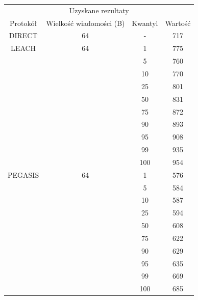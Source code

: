 \documentclass[a4paper,12pt,twoside,openany]{report}
\begin{document}
\begin{longtable}{*{4}{c}}
\toprule
\multicolumn{4}{c}{Uzyskane rezultaty} \\
Protokół	& Wielkość wiadomości (B)	& Kwantyl	& Wartość \\
\midrule
\endhead
DIRECT	& 64 	& -	& 717 \\*
\midrule
LEACH	& 64	& 1	& 775 \\*
	&	& 5	& 760 \\*
	&	& 10	& 770 \\*
	&	& 25	& 801 \\*
	&	& 50	& 831 \\*
	&	& 75	& 872 \\*
	&	& 90	& 893 \\*
	&	& 95	& 908 \\*
	&	& 99	& 935 \\*
	&	& 100	& 954 \\*
\midrule
PEGASIS	& 64	& 1	& 576 \\*
	&	& 5	& 584 \\*
	&	& 10	& 587 \\*
	&	& 25	& 594 \\*
	&	& 50	& 608 \\*
	&	& 75	& 622 \\*
	&	& 90	& 629 \\*
	&	& 95	& 635 \\*
	&	& 99	& 669 \\*
	&	& 100	& 685 \\*
\bottomrule
\end{longtable}
\end{document}
